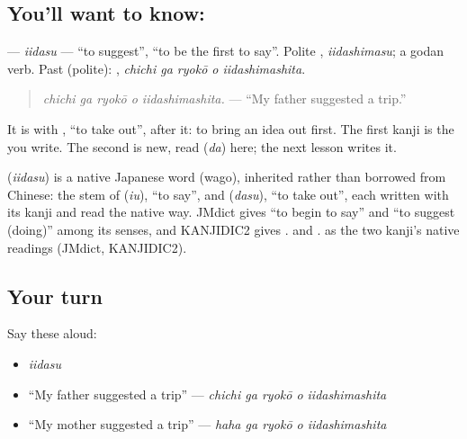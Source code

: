 \subsection*{You'll want to know: }
\textbf{} — \emph{iidasu} — \textquotedblleft{}to suggest\textquotedblright{}, \textquotedblleft{}to be the first to say\textquotedblright{}. Polite \textbf{}, \emph{iidashimasu}; a godan verb. Past (polite): \textbf{  }, \emph{chichi ga ryokō o iidashimashita}.

\begin{quote}
\textbf{  }
\end{quote}

\begin{quote}
\emph{chichi ga ryokō o iidashimashita.} — \textquotedblleft{}My father suggested a trip.\textquotedblright{}
\end{quote}

It is \textbf{} with \textbf{}, \textquotedblleft{}to take out\textquotedblright{}, after it: to bring an idea out first. The first kanji is the \textbf{} you write. The second is new, read \textbf{} (\emph{da}) here; the next lesson writes it.

\begin{cousinweb}
\textbf{} (\emph{iidasu}) is a native Japanese word (wago), inherited rather than borrowed from Chinese: the stem of \textbf{} (\emph{iu}), \textquotedblleft{}to say\textquotedblright{}, and \textbf{} (\emph{dasu}), \textquotedblleft{}to take out\textquotedblright{}, each written with its kanji and read the native way. JMdict gives \textquotedblleft{}to begin to say\textquotedblright{} and \textquotedblleft{}to suggest (doing)\textquotedblright{} among its senses, and KANJIDIC2 gives . and . as the two kanji's native readings (JMdict, KANJIDIC2).
\end{cousinweb}

\subsection*{Your turn}
Say these aloud:

\begin{itemize}
\raggedright
  \item \emph{iidasu}
  \item \textquotedblleft{}My father suggested a trip\textquotedblright{} — \emph{chichi ga ryokō o iidashimashita}
  \item \textquotedblleft{}My mother suggested a trip\textquotedblright{} — \emph{haha ga ryokō o iidashimashita}
\end{itemize}

